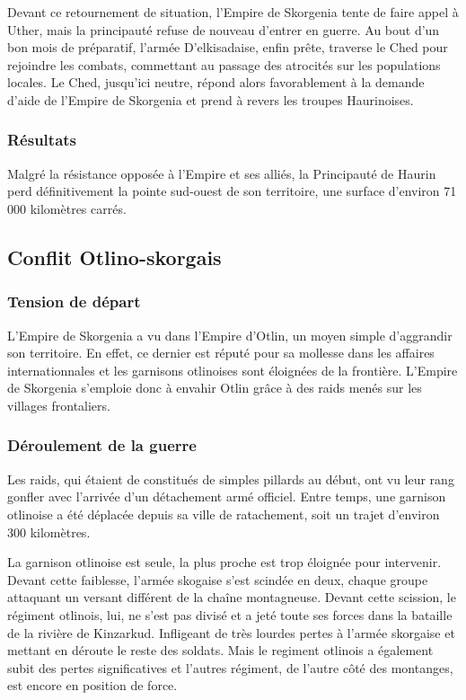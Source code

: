 \documentclass[french, a4paper, 12pt]{article}
\begin{document}
		Devant ce retournement de situation, l'Empire de Skorgenia tente de faire appel à Uther, mais la principauté refuse de nouveau d'entrer en guerre. Au bout d'un bon mois de préparatif, l'armée D'elkisadaise, enfin prête, traverse le Ched pour rejoindre les combats, commettant au passage des atrocités sur les populations locales. Le Ched, jusqu'ici neutre, répond alors favorablement à la demande d'aide de l'Empire de Skorgenia et prend à revers les troupes Haurinoises.

		\subsubsection{Résultats}

		Malgré la résistance opposée à l'Empire et ses alliés, la Principauté de Haurin perd définitivement la pointe sud-ouest de son territoire, une surface d'environ 71 000 kilomètres carrés.

	\subsection{Conflit Otlino-skorgais}
		
		\subsubsection{Tension de départ}
		
		L'Empire de Skorgenia a vu dans l'Empire d'Otlin, un moyen simple d'aggrandir son territoire. En effet, ce dernier est réputé pour sa mollesse dans les affaires internationnales et les garnisons otlinoises sont éloignées de la frontière. L'Empire de Skorgenia s'emploie donc à envahir Otlin grâce à des raids menés sur les villages frontaliers.
		
		\subsubsection{Déroulement de la guerre}
		
		Les raids, qui étaient de constitués de simples pillards au début, ont vu leur rang gonfler avec l'arrivée d'un détachement armé officiel. Entre temps, une garnison otlinoise a été déplacée depuis sa ville de ratachement, soit un trajet d'environ 300 kilomètres.
		
		La garnison otlinoise est seule, la plus proche est trop éloignée pour intervenir. Devant cette faiblesse, l'armée skogaise s'est scindée en deux, chaque groupe attaquant un versant différent de la chaîne montagneuse. Devant cette scission, le régiment otlinois, lui, ne s'est pas divisé et a jeté toute ses forces dans la bataille de la rivière de Kinzarkud. Infligeant de très lourdes pertes à l'armée skorgaise et mettant en déroute le reste des soldats. Mais le regiment otlinois a également subit des pertes significatives et l'autres régiment, de l'autre côté des montanges, est encore en position de force.
		
		
\end{document}
